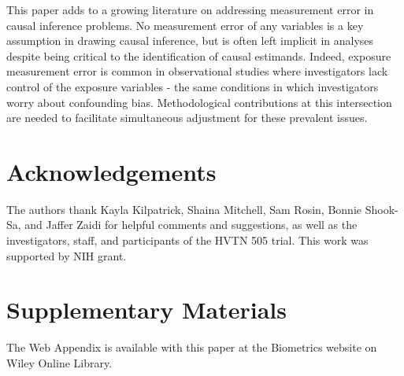 \documentclass[useAMS,usenatbib,referee]{biom}
\begin{document}
This paper adds to a growing literature on addressing measurement error in causal inference problems. No measurement error of any variables is a key assumption in drawing causal inference, but is often left implicit in analyses despite being critical to the identification of causal estimands. Indeed, exposure measurement error is common in observational studies where investigators lack control of the exposure variables - the same conditions in which investigators worry about confounding bias. Methodological contributions at this intersection are needed to facilitate simultaneous adjustment for these prevalent issues.





\backmatter


\section*{Acknowledgements}

The authors thank Kayla Kilpatrick, Shaina Mitchell, Sam Rosin, Bonnie Shook-Sa, and Jaffer Zaidi for helpful comments and suggestions, as well as the investigators, staff, and participants of the HVTN 505 trial. This work was supported by NIH grant. \vspace*{-8pt}


\section*{Supplementary Materials}

The Web Appendix is available with this paper at the Biometrics website on Wiley Online Library.\vspace*{-8pt}

\end{document}
